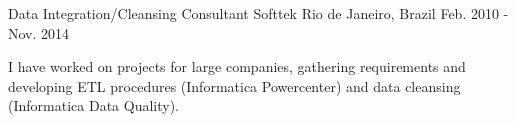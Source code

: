 \begin{cventries}
  \cventry
    {Data Integration/Cleansing Consultant} %
    {Softtek} %
    {Rio de Janeiro, Brazil} %
    {Feb. 2010 - Nov. 2014} %
    {
      \begin{cvitems} %
        I have worked on projects for large companies, gathering requirements and developing ETL procedures (Informatica Powercenter) and data cleansing (Informatica Data Quality).
      \end{cvitems}
    }

\end{cventries}
